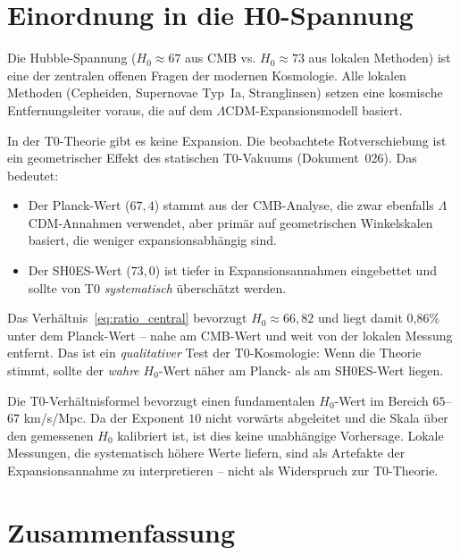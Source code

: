 \section{Einordnung in die H0-Spannung}
\label{sec:hubble}

Die Hubble-Spannung ($H_0 \approx 67$ aus CMB vs. $H_0 \approx 73$ aus
lokalen Methoden) ist eine der zentralen offenen Fragen der modernen
Kosmologie. Alle lokalen Methoden (Cepheiden, Supernovae Typ~Ia,
Stranglinsen) setzen eine kosmische Entfernungsleiter voraus, die
auf dem $\Lambda$CDM-Expansionsmodell basiert.

In der T0-Theorie gibt es keine Expansion. Die beobachtete
Rotverschiebung ist ein geometrischer Effekt des statischen
T0-Vakuums (Dokument~026). Das bedeutet:

\begin{itemize}
    \item Der Planck-Wert ($67{,}4$) stammt aus der CMB-Analyse, die
          zwar ebenfalls $\Lambda$CDM-Annahmen verwendet, aber
          primär auf geometrischen Winkelskalen basiert, die
          weniger expansionsabhängig sind.
    \item Der SH0ES-Wert ($73{,}0$) ist tiefer in
          Expansionsannahmen eingebettet und sollte von T0
          \emph{systematisch} überschätzt werden.
\end{itemize}

Das Verhältnis~\eqref{eq:ratio_central} bevorzugt $H_0 \approx 66{,}82$
und liegt damit 0,86\% unter dem Planck-Wert -- nahe am CMB-Wert und weit von der
lokalen Messung entfernt.
Das ist ein \emph{qualitativer} Test der T0-Kosmologie: Wenn die Theorie
stimmt, sollte der \emph{wahre} $H_0$-Wert näher am Planck- als am
SH0ES-Wert liegen.

\begin{keyresult}
    Die T0-Verhältnisformel bevorzugt einen fundamentalen $H_0$-Wert
    im Bereich $65$--$67$ km/s/Mpc. Da der Exponent $10$ nicht vorwärts
    abgeleitet und die Skala über den gemessenen $H_0$ kalibriert ist, ist
    dies keine unabhängige Vorhersage. Lokale Messungen, die
    systematisch höhere Werte liefern, sind als Artefakte der
    Expansions\-annahme zu interpretieren -- nicht als
    Widerspruch zur T0-Theorie.
\end{keyresult}

\section{Zusammenfassung}
\label{sec:zusammenfassung}

